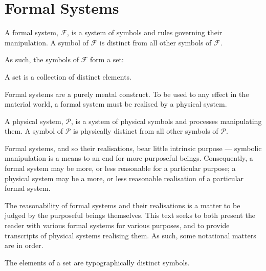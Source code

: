 
\section{Formal Systems}

\begin{notion}

A formal system, $\mathcal{F}$, is a system of symbols and rules governing
their manipulation. A symbol of $\mathcal{F}$ is distinct from all other
symbols of $\mathcal{F}$.

\end{notion}

As such, the symbols of $\mathcal{F}$ form a set:

\begin{definition}

A set is a collection of distinct elements.

\end{definition}

Formal systems are a purely mental construct. To be used to any effect in the
material world, a formal system must be realised by a physical system.

\begin{notion}

A physical system, $\mathcal{P}$, is a system of physical symbols and processes
manipulating them. A symbol of $\mathcal{P}$ is physically distinct from all
other symbols of $\mathcal{P}$.

\end{notion}

Formal systems, and so their realisations, bear little intrinsic purpose ---
symbolic manipulation is a means to an end for more purposeful beings.
Consequently, a formal system may be more, or less reasonable for a particular
purpose; a physical system may be a more, or less reasonable realisation of a
particular formal system.

The reasonability of formal systems and their realisations is a matter to be
judged by the purposeful beings themselves. This text seeks to both present the
reader with various formal systems for various purposes, and to provide
transcripts of physical systems realising them. As such, some notational
matters are in order.

\begin{notation}

The elements of a set are typographically distinct symbols.

\end{notation}

